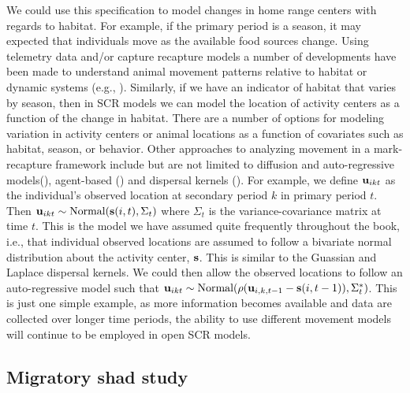 We could use this specification to model changes in home range centers
with regards to habitat.  For example, if the primary period is a
season, it may expected that individuals move as the available food
sources change. Using telemetry data and/or capture recapture models a
number of developments have been made to understand animal movement
patterns relative to habitat or dynamic systems (e.g.,
\cite{jonsen_etal:2005, hooten_wikle:2010}).  Similarly, if we have an
indicator of habitat that varies by season, then in SCR models we can
model the location of activity centers as a function of the change in
habitat.  There are a number of options for modeling variation in
activity centers or animal locations as a function of covariates such
as habitat, season, or behavior.  Other approaches to analyzing
movement in a mark-recapture framework include but are not limited to
diffusion and auto-regressive models(\cite{ovaskainen:2004,
  ovaskainen_etal:2008}), agent-based (\cite{grimm_etal:2005,
  hooten_etal:2010}) and dispersal kernels
(\cite{fujiwara_etal:2006}).  For example, we define ${\bf u}_{ikt}$ as the
individual's observed location at secondary period $k$ in primary
period $t$.
Then ${\bf u}_{ikt} \sim \mbox{Normal}({\bf s}(i,t), \Sigma_t)$ where
$\Sigma_t$ is the variance-covariance matrix at time $t$.  This is the
model we have assumed quite frequently throughout the book, i.e., that
individual observed locations are assumed to follow a bivariate normal
distribution about the activity center, ${\bf s}$. This is similar to
the Guassian and Laplace dispersal kernels.  We could then allow the
observed locations to follow an auto-regressive model such that ${\bf
  u}_{ikt} \sim \mbox{Normal}(\rho ({\bf u}_{i,k,t-1} - {\bf
  s}(i,t-1)), \Sigma^{*}_t)$.  This is just one simple example, as
more information becomes available and data are collected over longer
time periods, the ability to use different movement models will
continue to be employed in open SCR models.


\subsection{Migratory shad study}

